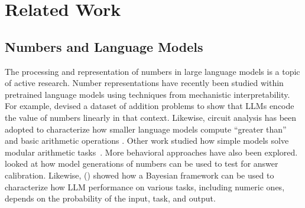 \section{Related Work}
\subsection{Numbers and Language Models}
The processing and representation of numbers in large language models is a topic of active research. Number representations have recently been studied within pretrained language models using techniques from mechanistic interpretability. For example, \citet{zhu-etal-2025-language} devised a dataset of addition problems to show that LLMs encode the value of numbers linearly in that context. Likewise, circuit analysis has been adopted to characterize how smaller language models compute ``greater than''~\cite{hanna2023how} and basic arithmetic operations \cite{stolfo2023mechanisticinterpretationarithmeticreasoning}. Other work studied how simple models solve modular arithmetic tasks~\cite{nanda2023progressmeasuresgrokkingmechanistic}.  
More behavioral approaches have also been explored. \citet{tian2023just} looked at how model generations of numbers can be used to test for answer calibration. Likewise, \citeauthor{mccoy2023embersautoregressionunderstandinglarge} (\citeyear{mccoy2023embersautoregressionunderstandinglarge,mccoy2024languagemodeloptimizedreasoning}) showed how a Bayesian framework can be used to characterize how LLM performance on various tasks, including numeric ones, depends on the probability of the input, task, and output.

